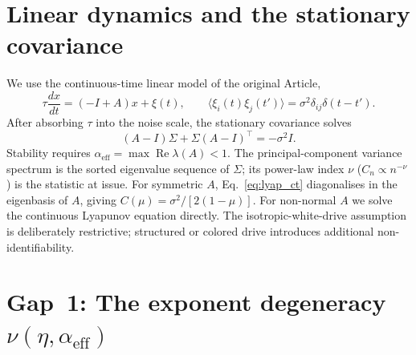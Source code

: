 \documentclass[11pt]{article}
\newcommand{\alphaeff}{\alpha_{\mathrm{eff}}}
\begin{document}
\section{Linear dynamics and the stationary covariance}
\label{sec:linear}

We use the continuous-time linear model of the original Article,
\begin{equation}
\tau\frac{dx}{dt}=(-I+A)x+\xi(t),\qquad
\langle\xi_i(t)\xi_j(t')\rangle = \sigma^2\delta_{ij}\delta(t-t').
\end{equation}
After absorbing $\tau$ into the noise scale, the stationary covariance solves
\begin{equation}
(A-I)\Sigma+\Sigma(A-I)^\top=-\sigma^2 I. \label{eq:lyap_ct}
\end{equation}
Stability requires $\alphaeff=\max\operatorname{Re}\lambda(A)<1$. The
principal-component variance spectrum is the sorted eigenvalue sequence of
$\Sigma$; its power-law index $\nu$ ($C_n\propto n^{-\nu}$) is the statistic at
issue. For symmetric $A$, Eq.~\eqref{eq:lyap_ct} diagonalises in the eigenbasis
of $A$, giving $C(\mu)=\sigma^2/[2(1-\mu)]$. For non-normal $A$ we solve the
continuous Lyapunov equation directly. The isotropic-white-drive assumption is
deliberately restrictive; structured or colored drive introduces additional
non-identifiability.

\section{Gap~1: The exponent degeneracy \texorpdfstring{$\nu(\eta,\alphaeff)$}{nu(eta, alpha_eff)}}
\label{sec:degeneracy}
\end{document}
